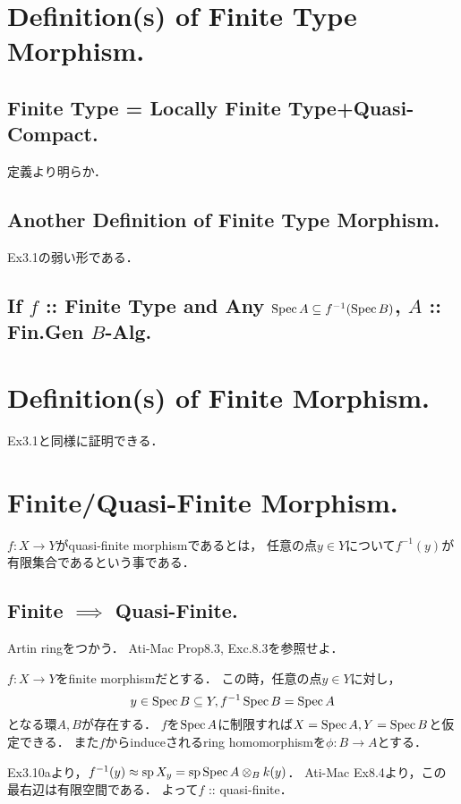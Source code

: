 \documentclass[a4paper]{jsarticle}
\newcommand{\basesp}{\operatorname{sp}}
\begin{document}
\section{Definition(s) of Finite Type Morphism.} %
    \subsection{Finite Type = Locally Finite Type+Quasi-Compact.}
    定義より明らか．

    \subsection{Another Definition of Finite Type Morphism.}
    Ex3.1の弱い形である．

    \subsection{If $f$ :: Finite Type and Any $\operatorname{Spec} A \subseteq f^{-1}(\operatorname{Spec} B)$, $A$ :: Fin.Gen $B$-Alg.}

\section{Definition(s) of Finite Morphism.} %
    Ex3.1と同様に証明できる．

\section{Finite/Quasi-Finite Morphism.} %
    $f: X \to Y$がquasi-finite morphismであるとは，
    任意の点$y \in Y$について$f^{-1}(y)$が有限集合であるという事である．

    \subsection{Finite $\implies$ Quasi-Finite.}
    Artin ringをつかう．
    Ati-Mac Prop8.3, Exc.8.3を参照せよ．
    
    $f: X \to Y$をfinite morphismだとする．
    この時，任意の点$y \in Y$に対し，
    \[ y \in \operatorname{Spec} B \subseteq Y, f^{-1}\operatorname{Spec} B=\operatorname{Spec} A \]
    となる環$A,B$が存在する．
    $f$を$\operatorname{Spec} A$に制限すれば$X=\operatorname{Spec} A, Y=\operatorname{Spec} B$と仮定できる．
    また$f$からinduceされるring homomorphismを$\phi: B \to A$とする．
    
    Ex3.10aより，$f^{-1}(y) \homeo \basesp X_y=\basesp \Spec A \otimes_B k(y)$．
    Ati-Mac Ex8.4より，この最右辺は有限空間である．
    よって$f$ :: quasi-finite．
\end{document}
